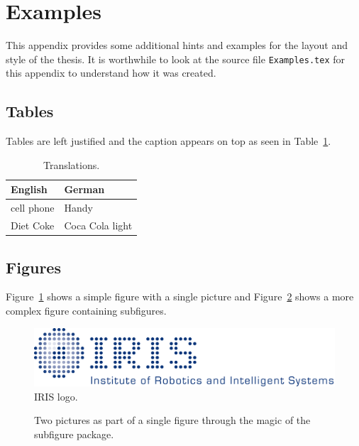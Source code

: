 \section{Examples}
\label{s:Examples}

This appendix provides some additional hints and examples for the
layout and style of the thesis. It is worthwhile to look at the source
file \verb|Examples.tex| for this appendix to understand how it was
created.



\subsection{Tables}

Tables are left justified and the caption appears on top as seen in
Table~\ref{t:Translations}.

\begin{table}[ht]
\caption[Translations]{\label{t:Translations}Translations.}
\begin{tabular}{ll}
\hline
\textbf{English} & \textbf{German}\\
\hline
cell phone       & Handy\\
Diet Coke        & Coca Cola light\\
\hline
\end{tabular}
\end{table}



\subsection{Figures}

Figure~\ref{f:IRISlogo} shows a simple figure with a single picture
and Figure~\ref{f:SubfigureExample} shows a more complex figure
containing subfigures.

\begin{figure}[ht]
\centering
\includegraphics[width=.6\linewidth]{IRISlogo}
\caption[IRIS logo]{\label{f:IRISlogo}IRIS logo.}
\end{figure}

\begin{figure}[ht]
\centering
{}\quad
{}
\caption[Subfigure example]{\label{f:SubfigureExample}Two pictures as
  part of a single figure through the magic of the subfigure package.}
\end{figure}



